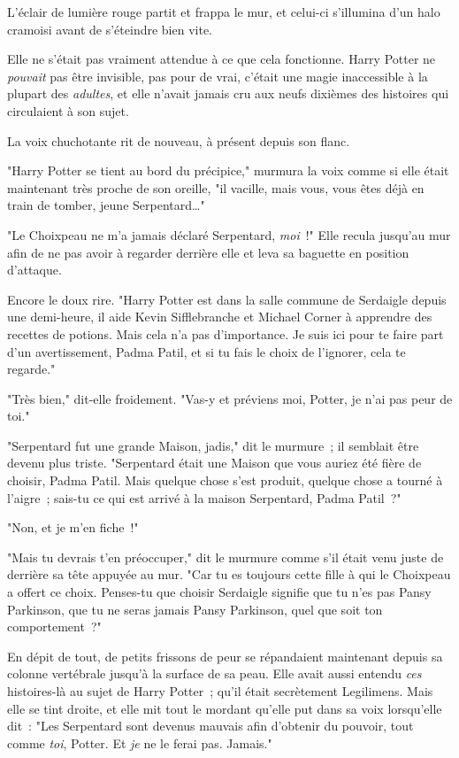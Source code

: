 L'éclair de lumière rouge partit et frappa le mur, et celui-ci s'illumina d'un halo cramoisi avant de s'éteindre bien vite.

Elle ne s'était pas vraiment attendue à ce que cela fonctionne. Harry Potter ne \emph{pouvait} pas être invisible, pas pour de vrai, c'était une magie inaccessible à la plupart des \emph{adultes}, et elle n'avait jamais cru aux neufs dixièmes des histoires qui circulaient à son sujet.

La voix chuchotante rit de nouveau, à présent depuis son flanc.

"Harry Potter se tient au bord du précipice," murmura la voix comme si elle était maintenant très proche de son oreille, "il vacille, mais vous, vous êtes déjà en train de tomber, jeune Serpentard…"

"Le Choixpeau ne m'a jamais déclaré Serpentard, \emph{moi}~!" Elle recula jusqu'au mur afin de ne pas avoir à regarder derrière elle et leva sa baguette en position d'attaque.

Encore le doux rire. "Harry Potter est dans la salle commune de Serdaigle depuis une demi-heure, il aide Kevin Sifflebranche et Michael Corner à apprendre des recettes de potions. Mais cela n'a pas d'importance. Je suis ici pour te faire part d'un avertissement, Padma Patil, et si tu fais le choix de l'ignorer, cela te regarde."

"Très bien," dit-elle froidement. "Vas-y et préviens moi, Potter, je n'ai pas peur de toi."

"Serpentard fut une grande Maison, jadis," dit le murmure~; il semblait être devenu plus triste. "Serpentard était une Maison que vous auriez été fière de choisir, Padma Patil. Mais quelque chose s'est produit, quelque chose a tourné à l'aigre~; sais-tu ce qui est arrivé à la maison Serpentard, Padma Patil~?"

"Non, et je m'en fiche~!"

"Mais tu devrais t'en préoccuper," dit le murmure comme s'il était venu juste de derrière sa tête appuyée au mur. "Car tu es toujours cette fille à qui le Choixpeau a offert ce choix. Penses-tu que choisir Serdaigle signifie que tu n'es pas Pansy Parkinson, que tu ne seras jamais Pansy Parkinson, quel que soit ton comportement~?"

En dépit de tout, de petits frissons de peur se répandaient maintenant depuis sa colonne vertébrale jusqu'à la surface de sa peau. Elle avait aussi entendu \emph{ces} histoires-là au sujet de Harry Potter~; qu'il était secrètement Legilimens. Mais elle se tint droite, et elle mit tout le mordant qu'elle put dans sa voix lorsqu'elle dit~: "Les Serpentard sont devenus mauvais afin d'obtenir du pouvoir, tout comme \emph{toi}, Potter. Et \emph{je} ne le ferai pas. Jamais."

